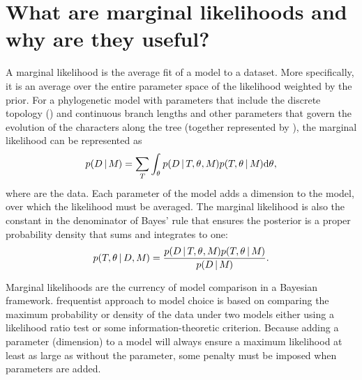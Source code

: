 \section{What are marginal likelihoods and why are they useful?}

\begin{linenomath}
A marginal likelihood is the average fit of a model to a dataset.
More specifically, it is an average over the entire parameter space of the
likelihood weighted by the prior.
For a phylogenetic model \model with parameters that include the discrete
topology (\topology) and continuous branch lengths and other parameters that
govern the evolution of the characters along the tree (together represented by
\evoparameters), the marginal likelihood can be represented as
\begin{equation}
    p(D \,|\, M_{}) =
    \sum\limits_{T_{}}
    \int_{\theta_{}}
    p( D \,|\, T_{}, \theta_{}, M_{})
    p(T_{}, \theta_{} \,|\, M_{})
    \mathrm{d}\theta_{},
    \label{eq:marginalLikelihood}
\end{equation}
where \data are the data.
Each parameter of the model adds a dimension to the model, over which the
likelihood must be averaged.
The marginal likelihood is also the 
constant in the denominator of Bayes' rule that ensures the posterior is a
proper probability density that sums and integrates to one:
\begin{equation}
    p(T_{}, \theta_{} \,|\, D, M_{}) = \frac{
        p(D \,|\, T_{}, \theta_{}, M_{})
        p(T_{}, \theta_{} \,|\, M_{})
    }{
        p(D \,|\, M_{})
    }.
    \label{eq:bayesRule}
\end{equation}
\end{linenomath}


Marginal likelihoods are the currency of model comparison in a Bayesian
framework.
 frequentist approach to model
choice is based on comparing the maximum probability or density of the
data under two models either using a likelihood ratio test or some
information-theoretic criterion.
Because adding a parameter (dimension) to a model will always ensure
a maximum likelihood at least as large as without the parameter, some
penalty must be imposed when parameters are added.

